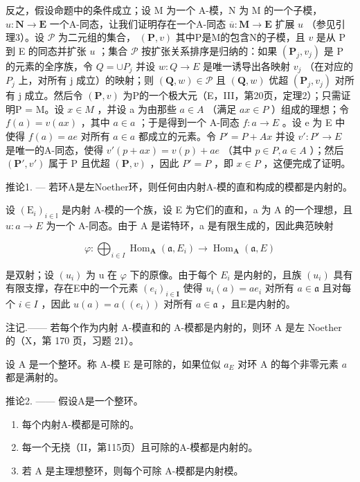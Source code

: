 反之，假设命题中的条件成立；设 M 为一个 A-模，N 为 M 的一个子模， \(u: \mathbf{N} \to \mathbf{E}\) 一个A-同态，让我们证明存在一个A-同态 \(\overline{u}: \mathbf{M} \to \mathbf{E}\) 扩展 \(u\) （参见引理3）。设 \(\mathcal{P}\) 为二元组的集合， \((\mathbf{P}, v)\) 其中P是M的包含N的子模，且 \(v\) 是从 P 到 E 的同态并扩张 \(u\) ；集合 \(\mathcal{P}\) 按扩张关系排序是归纳的：如果 \((\mathbf{P}_{j}, v_{j})\) 是 P 的元素的全序族，令 \(Q = \cup P_{j}\) 并设 \(w : Q \to E\) 是唯一诱导出各映射 \(v_{j}\) （在对应的 \(P_{j}\) 上，对所有 j 成立）的映射；则 \((\mathbf{Q}, w) \in \mathcal{P}\) 且 \((\mathbf{Q}, w)\) 优超 \((\mathbf{P}_{j}, v_{j})\) 对所有 j 成立。然后令 \((\mathbf{P}, v)\) 为P的一个极大元（E，III，第20页，定理2）；只需证明P = M。设 \(x \in M\) ，并设 a 为由那些 \(a \in A\) （满足 \(ax \in P\) ）组成的理想；令 \(f(a) = v(ax)\) ，其中 \(a \in a\) ；于是得到一个 A-同态 \(f : a \to E\) 。设 e 为 E 中使得 \(f(a) = ae\) 对所有 \(a \in a\) 都成立的元素。令 \(P' = P + Ax\) 并设 \(v' : P' \to E\) 是唯一的A-同态，使得 \(v'(p + ax) = v(p) + ae\) （其中 \(p \in P, a \in A\) ）；然后 \((\mathbf{P}', v')\) 属于 P 且优超 \((\mathbf{P}, v)\) ，因此 \(P' = P\) ，即 \(x \in P\) ，这便完成了证明。

推论1. --- 若环A是左Noether环，则任何由内射A-模的直和构成的模都是内射的。

设 \((\mathrm{E}_{i})_{i\in\mathbb{I}}\) 是内射 A-模的一个族，设 E 为它们的直和，a 为 A 的一个理想，且 \(u:a\to E\) 为一个 A-同态。由于 A 是诺特环，a 是有限生成的，因此典范映射

\[
\varphi : \bigoplus_ {i \in I} \operatorname{Hom} _ {\mathbf {A}} (\mathfrak {a}, E _ {i}) \rightarrow \operatorname{Hom} _ {\mathbf {A}} (\mathfrak {a}, E)
\]

是双射；设 \((u_{i})\) 为 u 在 \(\varphi\) 下的原像。由于每个 \(E_{i}\) 是内射的，且族 \((u_{i})\) 具有有限支撑，存在E中的一个元素 \((e_{i})_{i\in\mathbf{I}}\) 使得 \(u_{i}(a)=ae_{i}\) 对所有 \(a\in\mathfrak{a}\) 且对每个 \(i\in I\) ，因此 \(u(a)=a((e_{i}))\) 对所有 \(a\in\mathfrak{a}\) ，且E是内射的。

注记.—— 若每个作为内射 A-模直和的 A-模都是内射的，则环 A 是左 Noether 的（X，第 170 页，习题 21）。

设 A 是一个整环。称 A-模 E 是可除的，如果位似 \(a_{E}\) 对环 A 的每个非零元素 \(a\) 都是满射的。

推论2. —— 假设A是一个整环。

\begin{enumerate}
\def\labelenumi{\alph{enumi})}
\item
  每个内射A-模都是可除的。
\item
  每一个无挠（II，第115页）且可除的A-模都是内射的。
\item
  若 A 是主理想整环，则每个可除 A-模都是内射模。
\end{enumerate}

